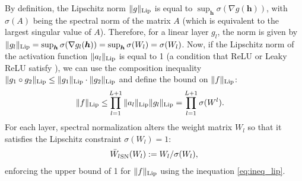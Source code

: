 By definition, the Lipschitz norm $\|g\|_{\rm Lip}$ is equal to $\sup_{\bm{h}} \sigma (\nabla g(\bm{h}))$, with $\sigma (A)$ being the spectral norm of the matrix $A$ (which is equivalent to the largest singular value of $A$). Therefore, for a linear layer $g_l$, the norm is given by $\|g_l\|_{\rm Lip} = \sup_{\bm{h}} \sigma (\nabla g_l(\bm{h})) = \sup_{\bm{h}} \sigma (W_l) = \sigma (W_l) $. Now, if the Lipschitz norm of the activation function $\|a_l\|_{\rm Lip}$ is equal to 1 (a condition that ReLU or Leaky ReLU satisfy ), we can use the composition inequality $\|g_1\circ g_2\|_{\rm Lip}\leq\|g_1\|_{\rm Lip}\cdot\|g_2\|_{\rm Lip}$ and define the bound on $\|f\|_{\rm Lip}$:
%
%
\begin{align}
 	\|f\|_{\rm Lip} \leq &  \prod_{l=1}^{L+1} \|a_{l}\|_{\rm Lip} \|g_{l}\|_{\rm Lip} = \prod_{l=1}^{L+1} \sigma (W^{l}). \label{eq:ineq_lip}
\end{align}
For each layer, spectral normalization alters the weight matrix $W_l$ so that it satisfies the Lipschitz constraint $\sigma (W_l) = 1$:
\begin{align}
\bar{W_l}_{\rm SN}(W_l) := W_l / \sigma (W_l) \label{eq:sn},
\end{align}
enforcing the upper bound of 1 for $\|f\|_{\rm Lip}$ using the inequation \ref{eq:ineq_lip}.
